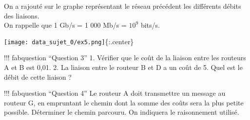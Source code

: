 \documentclass[
  12pt,
]{article}
\begin{document}
On a rajouté sur le graphe représentant le réseau précédent les
différents débits des liaisons.\\
On rappelle que 1 Gb/s = 1 000 Mb/s = \(10^9\) bits/s.

\texttt{[image: data\_sujet\_0/ex5.png]}\{:.center\}

!!! fabquestion ``Question 3'' 1. Vérifier que le coût de la liaison
entre les routeurs A et B est 0,01. 2. La liaison entre le routeur B et
D a un coût de 5. Quel est le débit de cette liaison ?

!!! fabquestion ``Question 4'' Le routeur A doit transmettre un message
au routeur G, en empruntant le chemin dont la somme des coûts sera la
plus petite possible. Déterminer le chemin parcouru. On indiquera le
raisonnement utilisé.
\end{document}
